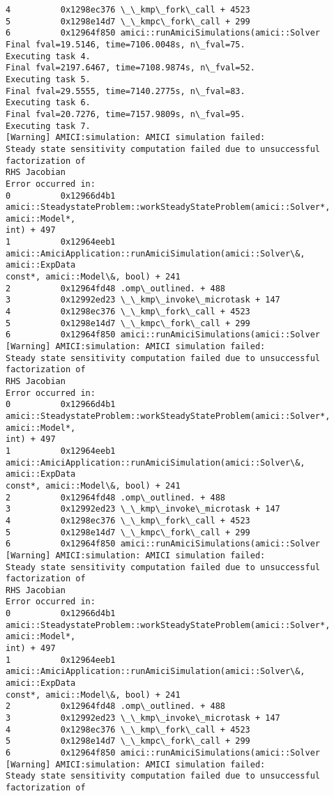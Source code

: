 \documentclass[11pt]{article}
\begin{document}
\begin{Verbatim}[commandchars=\\\{\}]
4          0x1298ec376 \_\_kmp\_fork\_call + 4523
5          0x1298e14d7 \_\_kmpc\_fork\_call + 299
6          0x12964f850 amici::runAmiciSimulations(amici::Solver
Final fval=19.5146, time=7106.0048s, n\_fval=75.
Executing task 4.
Final fval=2197.6467, time=7108.9874s, n\_fval=52.
Executing task 5.
Final fval=29.5555, time=7140.2775s, n\_fval=83.
Executing task 6.
Final fval=20.7276, time=7157.9809s, n\_fval=95.
Executing task 7.
[Warning] AMICI:simulation: AMICI simulation failed:
Steady state sensitivity computation failed due to unsuccessful factorization of
RHS Jacobian
Error occurred in:
0          0x12966d4b1
amici::SteadystateProblem::workSteadyStateProblem(amici::Solver*, amici::Model*,
int) + 497
1          0x12964eeb1
amici::AmiciApplication::runAmiciSimulation(amici::Solver\&, amici::ExpData
const*, amici::Model\&, bool) + 241
2          0x12964fd48 .omp\_outlined. + 488
3          0x12992ed23 \_\_kmp\_invoke\_microtask + 147
4          0x1298ec376 \_\_kmp\_fork\_call + 4523
5          0x1298e14d7 \_\_kmpc\_fork\_call + 299
6          0x12964f850 amici::runAmiciSimulations(amici::Solver
[Warning] AMICI:simulation: AMICI simulation failed:
Steady state sensitivity computation failed due to unsuccessful factorization of
RHS Jacobian
Error occurred in:
0          0x12966d4b1
amici::SteadystateProblem::workSteadyStateProblem(amici::Solver*, amici::Model*,
int) + 497
1          0x12964eeb1
amici::AmiciApplication::runAmiciSimulation(amici::Solver\&, amici::ExpData
const*, amici::Model\&, bool) + 241
2          0x12964fd48 .omp\_outlined. + 488
3          0x12992ed23 \_\_kmp\_invoke\_microtask + 147
4          0x1298ec376 \_\_kmp\_fork\_call + 4523
5          0x1298e14d7 \_\_kmpc\_fork\_call + 299
6          0x12964f850 amici::runAmiciSimulations(amici::Solver
[Warning] AMICI:simulation: AMICI simulation failed:
Steady state sensitivity computation failed due to unsuccessful factorization of
RHS Jacobian
Error occurred in:
0          0x12966d4b1
amici::SteadystateProblem::workSteadyStateProblem(amici::Solver*, amici::Model*,
int) + 497
1          0x12964eeb1
amici::AmiciApplication::runAmiciSimulation(amici::Solver\&, amici::ExpData
const*, amici::Model\&, bool) + 241
2          0x12964fd48 .omp\_outlined. + 488
3          0x12992ed23 \_\_kmp\_invoke\_microtask + 147
4          0x1298ec376 \_\_kmp\_fork\_call + 4523
5          0x1298e14d7 \_\_kmpc\_fork\_call + 299
6          0x12964f850 amici::runAmiciSimulations(amici::Solver
[Warning] AMICI:simulation: AMICI simulation failed:
Steady state sensitivity computation failed due to unsuccessful factorization of

\end{Verbatim}
\end{document}
